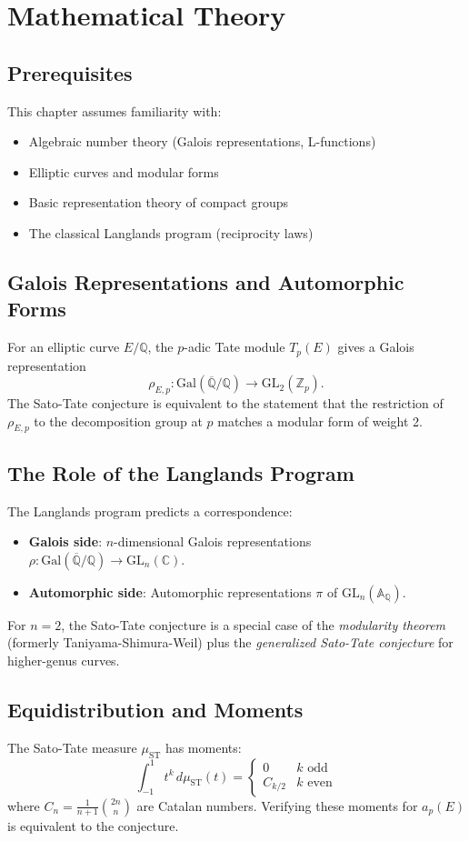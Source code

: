 \section{Mathematical Theory}


\subsection{Prerequisites}
This chapter assumes familiarity with:
\begin{itemize}
\item Algebraic number theory (Galois representations, L-functions)
\item Elliptic curves and modular forms
\item Basic representation theory of compact groups
\item The classical Langlands program (reciprocity laws)
\end{itemize}

\subsection{Galois Representations and Automorphic Forms}
For an elliptic curve $E/\mathbb{Q}$, the $p$-adic Tate module $T_p(E)$ gives a Galois representation
\[
\rho_{E,p}: \text{Gal}(\overline{\mathbb{Q}}/\mathbb{Q}) \to \text{GL}_2(\mathbb{Z}_p).
\]
The Sato-Tate conjecture is equivalent to the statement that the restriction of $\rho_{E,p}$ to the decomposition group at $p$ matches a modular form of weight 2.

\subsection{The Role of the Langlands Program}
The Langlands program predicts a correspondence:
\begin{itemize}
\item \textbf{Galois side}: $n$-dimensional Galois representations $\rho: \text{Gal}(\overline{\mathbb{Q}}/\mathbb{Q}) \to \text{GL}_n(\mathbb{C})$.
\item \textbf{Automorphic side}: Automorphic representations $\pi$ of $\text{GL}_n(\mathbb{A}_{\mathbb{Q}})$.
\end{itemize}
For $n=2$, the Sato-Tate conjecture is a special case of the \emph{modularity theorem} (formerly Taniyama-Shimura-Weil) plus the \emph{generalized Sato-Tate conjecture} for higher-genus curves.

\subsection{Equidistribution and Moments}
The Sato-Tate measure $\mu_{\text{ST}}$ has moments:
\[
\int_{-1}^1 t^k \, d\mu_{\text{ST}}(t) = \begin{cases}
0 & k \text{ odd} \\
C_{k/2} & k \text{ even}
\end{cases}
\]
where $C_n = \frac{1}{n+1}\binom{2n}{n}$ are Catalan numbers. Verifying these moments for $a_p(E)$ is equivalent to the conjecture.

